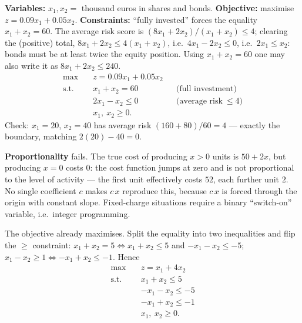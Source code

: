 \begin{solutions}
  \item \textbf{Variables:} $x_1,x_2=$ thousand euros in shares and
        bonds. \textbf{Objective:} maximise $z=0.09x_1+0.05x_2$.
        \textbf{Constraints:} ``fully invested'' forces the equality
        $x_1+x_2=60$. The average risk score is
        $(8x_1+2x_2)/(x_1+x_2)\le 4$; clearing the (positive) total,
        $8x_1+2x_2\le 4(x_1+x_2)$, i.e.\ $4x_1-2x_2\le 0$, i.e.\
        $2x_1\le x_2$: bonds must be at least twice the equity position.
        Using $x_1+x_2=60$ one may also write it as $8x_1+2x_2\le 240$.
        \[
          \begin{aligned}
            \max\quad & z=0.09x_1+0.05x_2\\
            \text{s.t.}\quad & x_1+x_2=60 &&\text{(full investment)}\\
            & 2x_1-x_2\le 0 &&\text{(average risk}\ \le 4)\\
            & x_1,\ x_2\ge 0 .
          \end{aligned}
        \]
        Check: $x_1=20$, $x_2=40$ has average risk
        $(160+80)/60=4$ — exactly the boundary, matching
        $2(20)-40=0$.

  \item \textbf{Proportionality} fails. The true cost of producing $x>0$
        units is $50+2x$, but producing $x=0$ costs $0$: the cost
        function jumps at zero and is not proportional to the level of
        activity — the first unit effectively costs $52$, each further
        unit $2$. No single coefficient $c$ makes $c\,x$ reproduce this,
        because $c\,x$ is forced through the origin with constant slope.
        Fixed-charge situations require a binary ``switch-on'' variable,
        i.e.\ integer programming.

  \item The objective already maximises. Split the equality into two
        inequalities and flip the $\ge$ constraint:
        $x_1+x_2=5 \iff x_1+x_2\le 5$ and $-x_1-x_2\le -5$;
        $x_1-x_2\ge 1 \iff -x_1+x_2\le -1$. Hence
        \[
          \begin{aligned}
            \max\quad & z=x_1+4x_2\\
            \text{s.t.}\quad & x_1+x_2\le 5\\
            & -x_1-x_2\le -5\\
            & -x_1+x_2\le -1\\
            & x_1,\ x_2\ge 0 .
          \end{aligned}
        \]


\end{solutions}
